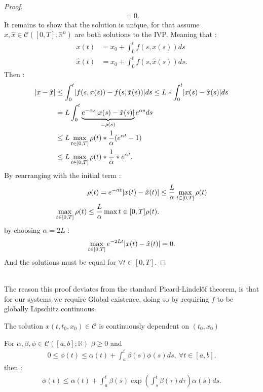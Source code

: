 \begin{proof}[Proof]
\begin{align*}
                                                                         = 0 
 .\end{align*}
 It remains to show that the solution is unique, for that assume $x,\hat{x}  \in  \mathcal{C}([0,T];\mathbb{R}^{n} )$ are both solutions to the IVP.
 Meaning that : 
 \begin{align*}
   x(t) &= x_0 + \int_0^{t} f(s,x(s)) ds \\
   \hat{x}(t) &= x_0 + \int_0^{t} f(s,\hat{x}(s) ) ds  
 .\end{align*}
 Then : 
 \begin{align*}
   \lvert x - \hat{x} \rvert &\le  \int_0^{t} \lvert f(s,x(s))-f(s,\hat{x}(s) )\rvert ds \le  L * \int_0^{t} \lvert x(s) - \hat{x}(s) \rvert ds  \\
                      &=  L \int_0^{t} \underbrace{e^{-\alpha s} \lvert x(s)-\hat{x}(s) \rvert}_{=\rho(s)} e^{\alpha s} ds \\
                      &\le  L \max_{t \in  [0,T]} \rho(t) * \frac{1}{\alpha } (e^{\alpha t} - 1) \\
                      &\le  L \max_{t \in  [0,T]} \rho(t) * \frac{1}{\alpha }* e^{\alpha t} 
 .\end{align*}
By rearranging with the initial term : 
\begin{align*}
  \rho(t) = e^{-\alpha t} \lvert x(t)-\hat{x}(t) \rvert &\le \frac{L}{\alpha } \max_{t \in [0,T]} \rho(t) \\
  \max_{t \in  [0,T]} \rho(t) \le  \frac{L}{\alpha } \max{t \in  [0,T]} \rho(t)
.\end{align*}
by choosing $\alpha = 2L$ : 
\begin{align*}
  \max_{t \in  [0,T]} e^{-2Lt} \lvert x(t)-\hat{x}(t) \rvert = 0 
.\end{align*}
And the solutions must be equal for $\forall  t \in  [0,T]$.
\end{proof}
\hspace{0mm}\\
The reason this proof deviates from the standard Picard-Lindelöf theorem, is that for our systems we require Global existence, doing so by requiring $f$ to be globally Lipschitz continuous.
\begin{theorem}
  The solution $x(t,t_0,x_0) \in  \mathcal{C}$ is continuously dependent on $(t_0,x_0)$
\end{theorem}
\begin{theorem}
  For $\alpha ,\beta ,\phi  \in  \mathcal{C}([a,b];\mathbb{R})$  $\beta \ge 0$ and 
  \begin{align*}
    0\le \phi(t) \le  \alpha(t) + \int_a^{t} \beta(s) \phi(s) ds , \ \forall t \in [a,b]
  .\end{align*}
  then : 
  \begin{align*}
    \phi(t) \le \alpha(t) + \int_{a}^{t} \beta(s) \exp\left(\int_s^{t} \beta(\tau ) d\tau   \right)  \alpha(s) ds
  .\end{align*}
\end{theorem}
